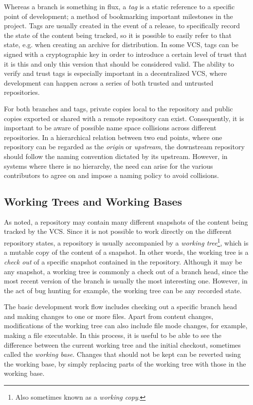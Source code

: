 Whereas a branch is something in flux, a \emph{tag} is a static reference to
a specific point of development; a method of bookmarking important
milestones in the project. Tags are usually created in the event of a
release, to specifically record the state of the content being
tracked, so it is possible to easily refer to that state, e.g. when
creating an archive for distribution. In some VCS, tags can be signed
with a cryptographic key in order to introduce a certain level of
trust that it is this and only this version that should be considered
valid. The ability to verify and trust tags is especially important in
a decentralized VCS, where development can happen across a series of
both trusted and untrusted repositories.

For both branches and tags, private copies local to the repository and
public copies exported or shared with a remote repository can exist.
Consequently, it is important to be aware of possible name space
collisions across different repositories. In a hierarchical relation
between two end points, where one repository can be regarded as the
\emph{origin} or \emph{upstream}, the downstream repository should
follow the naming convention dictated by its upstream. However, in
systems where there is no hierarchy, the need can arise for the various
contributors to agree on and impose a naming policy to avoid collisions.

\subsection{Working Trees and Working Bases}

As noted, a repository may contain many different snapshots of the content being
tracked by the VCS. Since it is not possible to work directly on the
different repository states, a repository is usually accompanied by a
\emph{working tree}\footnote{Also sometimes known as a \emph{working
copy}.}, which is a mutable copy of the content of a snapshot. In other words, the working tree
is a \emph{check out} of a specific snapshot contained in the repository.
Although it may be any snapshot, a working tree is commonly a check out
of a branch head, since the most recent version of the branch is
usually the most interesting one.  However, in the act of bug hunting for example,
the working tree can be any recorded state.

The basic development work flow includes checking out a specific branch
head and making changes to one or more files. Apart from content
changes, modifications of the working tree can also include file mode
changes, for example, making a file executable.  In this process,
it is useful to be able to see the difference between the current
working tree and the initial checkout, sometimes called the
\emph{working base}. Changes that should not be kept can be reverted
using the working base, by simply replacing parts of the working tree
with those in the working base.

